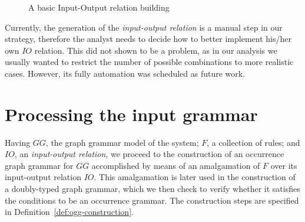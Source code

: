 \begin{example}
\begin{figure}[!ht]
  \caption{A basic Input-Output relation building}\label{fig:tests:inout}
\end{figure}

\end{example}

Currently, the generation of the \textit{input-output relation} is a manual step in our strategy, therefore the analyst needs to decide how to better implement his/her own $IO$ relation. This did not shown to be a problem, as in our analysis we usually wanted to restrict the number of possible combinations to more realistic cases. However, its fully automation was scheduled as future work.


\section{Processing the input grammar}

  Having $GG$, the graph grammar model of the system; $F$, a collection of rules; and $IO$, an \emph{input-output relation}, we proceed to the construction of an occurrence graph grammar for $GG$ accomplished by means of an amalgamation of $F$ over its input-output relation $IO$. This amalgamation is later used in the construction of a doubly-typed graph grammar, which we then check to verify whether it satisfies the conditions to be an occurrence grammar. The construction steps are specified in Definition~\ref{def:ogg-construction}.

